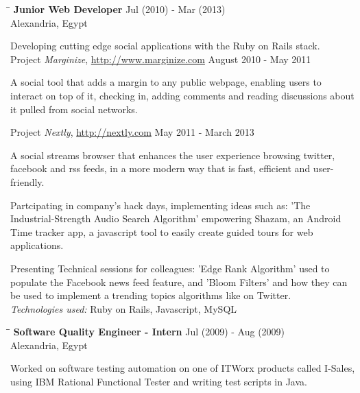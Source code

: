\documentclass{res}
\newenvironment{details}{\vspace*{-4pt} \begin{list}{\topsep 0pt \itemsep -2pt}}{\vspace*{4pt}\end{list}}
\begin{document}
\begin{resume}
   \begin{tabbing}
   \hspace{2.7in}\= \hspace{1.8in}\= \kill %
    {\bf Junior Web Developer}\> \hfill Jul (2010) - Mar (2013)\\
                                    \>Alexandria, Egypt
   \end{tabbing}\vspace{-20pt}      %
   Developing cutting edge social applications with the Ruby on Rails stack.\\
   Project \textit{Marginize}, \url{http://www.marginize.com} {August 2010 - May 2011}
   \begin{details}
   \item A social tool that adds a margin to any public webpage, enabling users to interact on top of it, checking in, adding comments and reading discussions about it pulled from social networks. 
   \end{details}
   Project \textit{Nextly}, \url{http://nextly.com} {May 2011 - March 2013}
   \begin{details}
   \item A social streams browser that enhances the user experience browsing twitter, facebook and rss feeds, in a more modern way that is fast, efficient and user-friendly. 
   \end{details}
   Partcipating in company's hack days, implementing ideas such as: 'The Industrial-Strength Audio Search Algorithm' empowering Shazam, an Android Time tracker app, a javascript tool to easily create guided tours for web applications.

   Presenting Technical sessions for colleagues: 'Edge Rank Algorithm' used to populate the Facebook news feed feature, and 'Bloom Filters' and how they can be used to implement a trending topics algorithms like on Twitter.\\
    {\sl Technologies used:} Ruby on Rails, Javascript, MySQL

   \begin{tabbing}
   \hspace{2.7in}\= \hspace{1.8in}\= \kill %
    {\bf Software Quality Engineer - Intern}\> \hfill Jul (2009) - Aug (2009)\\
                                    \>Alexandria, Egypt
   \end{tabbing}\vspace{-20pt}      %
   Worked on software testing automation on one of ITWorx products called I-Sales, using IBM Rational Functional Tester and writing test scripts in Java.


\end{resume}
\end{document}
